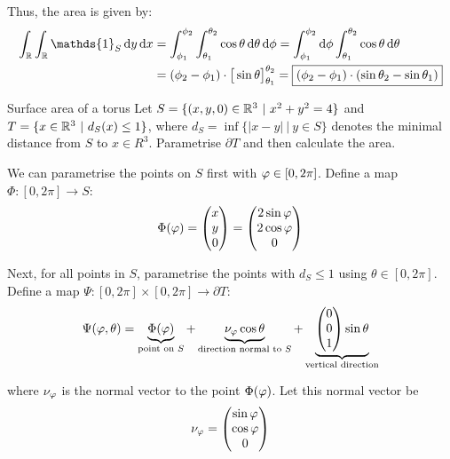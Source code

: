 \documentclass[12pt]{article}
\begin{document}
Thus, the area is given by: 
\begin{align*}
    \int_\R \int_\R \mathds{1}_S \dd y \dd x &= \int_{\phi_1}^{\phi_2} \int_{\theta_1}^{\theta_2} \cos\theta \dd \theta \dd \phi = \int_{\phi_1}^{\phi_2} \dd \phi \int_{\theta_1}^{\theta_2} \cos\theta \dd \theta \\
    &= (\phi_2 - \phi_1) \cdot \big[ \sin\theta \big]_{\theta_1}^{\theta_2} = \boxed{(\phi_2 - \phi_1) \cdot (\sin\theta_2 - \sin\theta_1)}
\end{align*}

\newpage

\begin{problem}{Surface area of a torus}{}
    Let $S = \{(x, y, 0) \in \mathbb{R}^3 \ |\ x^2 + y^2 = 4\}$ and $T = \{x \in \mathbb{R}^3\ |\ d_S(x) \leq 1\}$, where $d_S = \inf\{|x-y| \ |\ y \in S\}$ denotes the minimal distance from $S$ to $x \in R^3$. Parametrise $\partial T$ and then calculate the area.
\end{problem}

We can parametrise the points on $S$ first with $\varphi \in [0, 2\pi]$. Define a map $\Phi: [0, 2\pi] \rightarrow S$:
\begin{align*}
    \Phi(\varphi) = \begin{pmatrix} x \\ y \\ 0 \end{pmatrix} = \begin{pmatrix} 2\sin\varphi \\ 2\cos\varphi \\ 0 \end{pmatrix}
\end{align*}

Next, for all points in $S$, parametrise the points with $d_S \leq 1$ using $\theta \in [0, 2\pi]$. Define a map $\Psi: [0, 2\pi] \times [0, 2\pi] \rightarrow \partial T$:
\begin{align*}
    \Psi(\varphi, \theta) = \underbrace{\Phi(\varphi)}_{\text{point on } S} + \underbrace{\nu_{\varphi} \cos\theta}_{\text{direction normal to } S} + \underbrace{\begin{pmatrix} 0 \\ 0 \\ 1 \end{pmatrix} \sin\theta}_{\text{vertical direction}}
\end{align*}

where $\nu_\varphi$ is the normal vector to the point $\Phi(\varphi)$. Let this normal vector be
\begin{align*}
    \nu_\varphi = \begin{pmatrix} \sin\varphi \\ \cos\varphi \\ 0 \end{pmatrix}
\end{align*}
\end{document}
